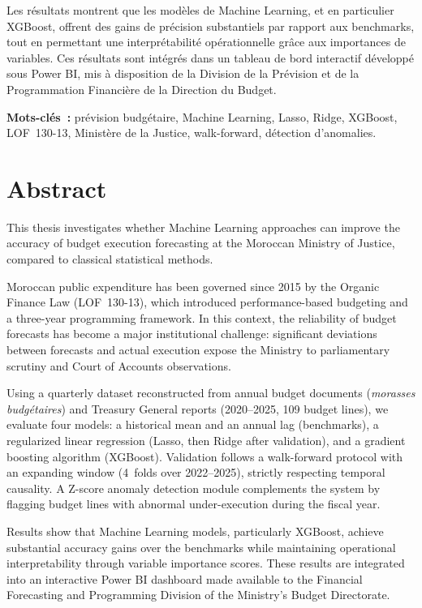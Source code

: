 \documentclass[12pt,a4paper]{article}
\begin{document}
Les r\'esultats montrent que les mod\`eles de Machine Learning, et en particulier XGBoost, offrent des gains de pr\'ecision substantiels par rapport aux benchmarks, tout en permettant une interpr\'etabilit\'e op\'erationnelle gr\^ace aux importances de variables. Ces r\'esultats sont int\'egr\'es dans un tableau de bord interactif d\'evelopp\'e sous Power BI, mis \`a disposition de la Division de la Pr\'evision et de la Programmation Financi\`ere de la Direction du Budget.

\bigskip
\noindent\textbf{Mots-cl\'es~:} pr\'evision budg\'etaire, Machine Learning, Lasso, Ridge, XGBoost, LOF~130-13, Minist\`ere de la Justice, walk-forward, d\'etection d'anomalies.

\newpage

\section*{Abstract}

This thesis investigates whether Machine Learning approaches can improve the accuracy of budget execution forecasting at the Moroccan Ministry of Justice, compared to classical statistical methods.

Moroccan public expenditure has been governed since 2015 by the Organic Finance Law (LOF~130-13), which introduced performance-based budgeting and a three-year programming framework. In this context, the reliability of budget forecasts has become a major institutional challenge: significant deviations between forecasts and actual execution expose the Ministry to parliamentary scrutiny and Court of Accounts observations.

Using a quarterly dataset reconstructed from annual budget documents (\textit{morasses budgétaires}) and Treasury General reports (2020--2025, 109 budget lines), we evaluate four models: a historical mean and an annual lag (benchmarks), a regularized linear regression (Lasso, then Ridge after validation), and a gradient boosting algorithm (XGBoost). Validation follows a walk-forward protocol with an expanding window (4~folds over 2022--2025), strictly respecting temporal causality. A Z-score anomaly detection module complements the system by flagging budget lines with abnormal under-execution during the fiscal year.

Results show that Machine Learning models, particularly XGBoost, achieve substantial accuracy gains over the benchmarks while maintaining operational interpretability through variable importance scores. These results are integrated into an interactive Power BI dashboard made available to the Financial Forecasting and Programming Division of the Ministry's Budget Directorate.
\end{document}
